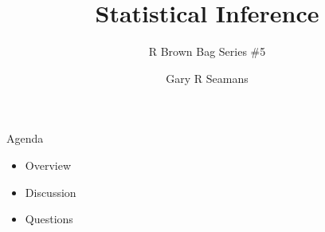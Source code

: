 \documentclass[11pt]{beamer}
\begin{document}
	\author{Gary R Seamans}
	\title{Statistical Inference}
	\subtitle{R Brown Bag Series \#5}
	\begin{frame}[plain]
		\maketitle
    \end{frame}

\begin{frame}{
	\begin{minipage}[t]{0.55\textwidth}
		Agenda
	\end{minipage}
	\hfill
	\begin{minipage}[t]{0.35\textwidth}
		\flushright
	\end{minipage}
}{}
\begin{center}
	\begin{itemize}
		\item Overview
		\item Discussion
		\item Questions
	\end{itemize}
\end{center}
\end{frame}
\end{document}
